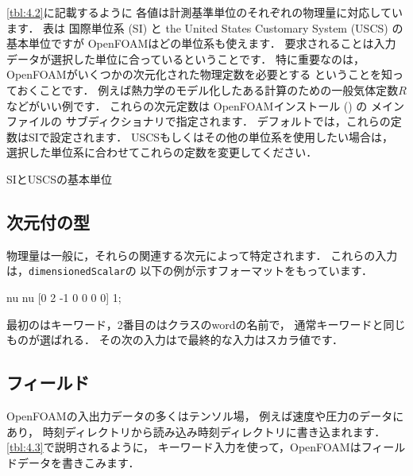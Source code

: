 \autoref{tbl:4.2}に記載するように
各値は計測基準単位のそれぞれの物理量に対応しています．
表は
%
%
国際単位系 (SI) と
%
%
%
the United States Customary System (USCS) の
%
基本単位ですが
OpenFOAMはどの単位系も使えます．
要求されることは入力データが選択した単位に合っているということです．
特に重要なのは，OpenFOAMがいくつかの次元化された物理定数を必要とする
ということを知っておくことです．
例えば熱力学のモデル化したある計算のための一般気体定数$R$などがいい例です．
これらの次元定数は
OpenFOAMインストール () の
メインファイルの
サブディクショナリで指定されます．
デフォルトでは，これらの定数はSIで設定されます．
USCSもしくはその他の単位系を使用したい場合は，
選択した単位系に合わせてこれらの定数を変更してください．


\begin{table}[t]
 
 \caption{SIとUSCSの基本単位}
 \label{tbl:4.2}
\end{table}
%


\subsection{次元付の型}
\label{ssec:4.2.7}
物理量は一般に，それらの関連する次元によって特定されます．
これらの入力は，\verb|dimensionedScalar|の
以下の例が示すフォーマットをもっています．
\begin{OFverbatim}[file]
nu             nu  [0 2 -1 0 0 0 0]  1;
\end{OFverbatim}
最初のはキーワード，2番目のはクラスのwordの名前で，
通常キーワードと同じものが選ばれる．
その次の入力はで最終的な入力はスカラ値です．


\subsection{フィールド}
\label{ssec:4.2.8}
OpenFOAMの入出力データの多くはテンソル場，
例えば速度や圧力のデータにあり，
時刻ディレクトリから読み込み時刻ディレクトリに書き込まれます．
\autoref{tbl:4.3}で説明されるように，
キーワード入力を使って，OpenFOAMはフィールドデータを書きこみます．


